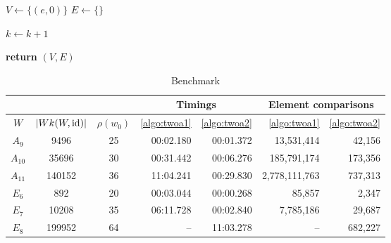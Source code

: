 \begin{algo}[TWOA2]
	\hfill
	\begin{algorithmic}[1]
	\State $V \gets \{(e,0)\}$
	\State $E \gets \{\}$

	 \label{algo:twoa2-k-loop}
		 \label{algo:twoa2-v-loop}
			 \label{algo:twoa2-s-loop}  \Comment{\todo}
			\EndFor
		\EndFor
		\State $k \gets k + 1$
	\EndFor

	\State \textbf{return} $(V,E)$
	\EndProcedure
	\end{algorithmic}
\end{algo}

\newpage

\begin{table}
	\centering
	\begin{tabular}{|c|c|c|r|r|r|r|}
	\hline
	\multicolumn{3}{|c|}{} & \multicolumn{2}{c|}{Timings} & \multicolumn{2}{c|}{Element comparisons}\\
	\hline
	$W$ & $|Wk(W,\operatorname{id})|$ & $\rho(w_0)$ & \ref{algo:twoa1} & \ref{algo:twoa2} & \ref{algo:twoa1} & \ref{algo:twoa2}\\
	\hline
	$A_9$ & 9496 & 25 & 00:02.180 & 00:01.372 & 13,531,414 & 42,156\\
	\hline
	$A_{10}$ & 35696 & 30 & 00:31.442 & 00:06.276 & 185,791,174 & 173,356\\
	\hline
	$A_{11}$ & 140152 & 36 & 11:04.241 & 00:29.830 & 2,778,111,763 & 737,313\\
	\hline
	$E_6$ & 892 & 20 & 00:03.044 & 00:00.268 & 85,857 & 2,347\\
	\hline
	$E_7$ & 10208 & 35 & 06:11.728 & 00:02.840 & 7,785,186 & 29,687\\
	\hline
	$E_8$ & 199952 & 64 & -- & 11:03.278 & -- & 682,227\\
	\hline
	\end{tabular}
	\caption{Benchmark}
	\label{tab:benchmark-twoa}
\end{table}